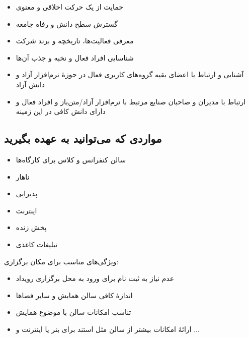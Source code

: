 \documentclass{article}
\begin{document}
{\begin{flushright}
\begin{itemize}
\item حمایت از یک حرکت اخلاقی و معنوی
\item گسترش سطح دانش و رفاه جامعه
\item معرفی فعالیت‌ها، تاریخچه و برند شرکت
\item شناسایی افراد فعال و نخبه و جذب آن‌ها
\item آشنایی و ارتباط با اعضای بقیه گروه‌های کاربری فعال در حوزهٔ نرم‌افزار آزاد و دانش آزاد
\item ارتباط با مدیران و صاحبان صنایع مرتبط با نرم‌افزار آزاد/متن‌باز و افراد فعال و دارای دانش کافی در این زمینه
\end{itemize}

\end{flushright}

\subsection{مواردی که می‌توانید به عهده بگیرید}


\begin{flushright}

\begin{itemize}
\item سالن کنفرانس و کلاس برای کارگاه‌ها
\item ناهار
\item پذیرایی
\item اینترنت
\item پخش زنده
\item تبلیغات کاغذی
\end{itemize}

\end{flushright}

\begin{flushright}

ویژگی‌های مناسب برای مکان برگزاری:

\begin{itemize}
\item عدم نیاز به ثبت نام برای ورود به محل برگزاری رویداد
\item اندازهٔ کافی سالن همایش و سایر فضاها
\item تناسب امکانات سالن با موضوع همایش
\item ارائهٔ امکانات بیشتر از سالن مثل استند برای بنر یا اینترنت و ... 
\end{itemize}

\end{flushright}

}
\end{document}
